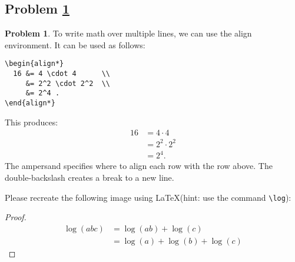 \documentclass[11pt]{article}
\theoremstyle{definition}
\theoremstyle{definition}
\newtheorem{required}{Problem}
\theoremstyle{definition}
\begin{document}
\subsection{Problem \ref{Latex4}}
\begin{required} \label{Latex4}
To write math over multiple lines, we can use the align environment.
It can be used as follows:
\begin{verbatim}
\begin{align*}
  16 &= 4 \cdot 4      \\
     &= 2^2 \cdot 2^2  \\
     &= 2^4 .
\end{align*}
\end{verbatim}
This produces:
\begin{align*}
  16 &= 4 \cdot 4      \\
     &= 2^2 \cdot 2^2  \\
     &= 2^4 .
\end{align*}
The ampersand specifies where to align each row with the row above. The double-backslash creates a break to a new line.

Please recreate the following image using \LaTeX (hint: use the command \texttt{\textbackslash log}):

\begin{center}
\end{center}
\end{required}

\begin{proof}
\begin{align*}
  \log (abc)  &= \log (ab) + \log (c)      \\
     &= \log (a) + \log (b) +\log (c)
\end{align*}
\end{proof}



\end{document}

